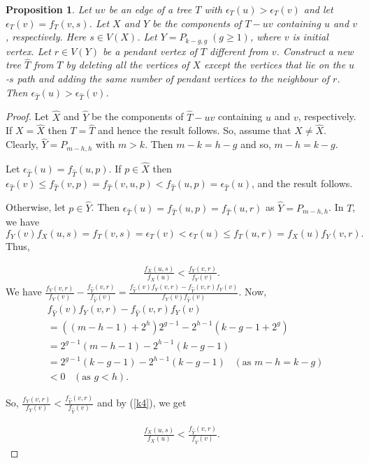 \documentclass[11pt]{article}
\newtheorem{proposition}[theorem]{Proposition}
\begin{document}
\begin{proposition} \label{prop5}
Let $uv$ be an edge of a tree $T$ with $\epsilon_{T}(u)>\epsilon_{T}(v)$ and let $\epsilon_{T}(v)=f_T(v,s)$. Let $X$ and $Y$ be the components of $T-uv$ containing $u$ and $v$, respectively. Here $s\in V(X)$.  Let $Y=P_{k-g,g}\;(g\geq 1)$, where $v$ is initial vertex. Let $r\in V(Y)$ be a pendant vertex of $T$ different from $v$. Construct a new tree $\hat{T}$ from $T$ by deleting all the vertices of $X$ except the vertices that lie on the $u$-$s$ path and adding the same number of pendant vertices to the neighbour of $r$. Then $\epsilon_{\hat{T}}(u)>\epsilon_{\hat{T}}(v)$.   
\end{proposition}
\begin{proof}
Let  $\hat{X}$ and $\hat{Y}$ be the components of $\hat{T}-uv$ containing $u$ and $v$, respectively. If $X=\hat{X}$ then $T=\hat{T}$ and hence the result follows. So, assume that $X\neq \hat{X}.$ Clearly, $\hat{Y}=P_{m-h,h}$ with $m>k$. Then $m-k=h-g$ and  so, $m-h=k-g$.

Let $\epsilon_{\hat{T}}(u)=f_{\hat{T}}(u,p)$. If $p\in \hat{X}$ then $\epsilon_{\hat{T}}(v)\leq f_{\hat{T}}(v,p)=f_{\hat{T}}(v,u,p)<f_{\hat{T}}(u,p)=\epsilon_{\hat{T}}(u)$, and the result follows. 

Otherwise, let $p\in \hat{Y}$. Then $\epsilon_{\hat{T}}(u)=f_{\hat{T}}(u,p)=f_{\hat{T}}(u,r)$ as $\hat{Y}=P_{m-h,h}$. In $T$, we have $$f_Y(v)f_X(u,s)=f_T(v,s)=\epsilon_{T}(v)<\epsilon_{T}(u)\leq f_{T}(u,r)=f_X(u)f_Y(v,r).$$ Thus,

\begin{align}\label{k4}
\frac{f_{X}(u,s)}{f_{X}(u)}<\frac{f_{Y}(v,r)}{f_{Y}(v)}.
\end{align}
We have $\frac{f_Y(v,r)}{f_Y(v)} - \frac{f_{\hat{Y}}(v,r)}{f_{\hat{Y}}(v)}=\frac{f_{\hat{Y}}(v)f_Y(v,r)-f_{\hat{Y}}(v,r)f_Y(v)}{f_Y(v)f_{\hat{Y}}(v)}.$ Now, 
\begin{align*} 
&f_{\hat{Y}}(v)f_Y(v,r)-f_{\hat{Y}}(v,r)f_Y(v)\\
&=((m-h-1)+2^h)2^{g-1}- 2^{h-1}(k-g-1+2^g)\\
&=2^{g-1}(m-h-1)-2^{h-1}(k-g-1)\\
&=2^{g-1}(k-g-1)-2^{h-1}(k-g-1)\;\;\;(\mbox{as $m-h=k-g$})\\
&< 0 \;\;\;(\mbox{as $g<h$}).
\end{align*} 

So, $\frac{f_Y(v,r)}{f_Y(v)} < \frac{f_{\hat{Y}}(v,r)}{f_{\hat{Y}}(v)}$ and by (\ref{k4}), we get 

\begin{align}\label{k5}
\frac{f_{X}(u,s)}{f_{X}(u)}<\frac{f_{\hat{Y}}(v,r)}{f_{\hat{Y}}(v)}.
\end{align}


\end{proof}
\end{document}
